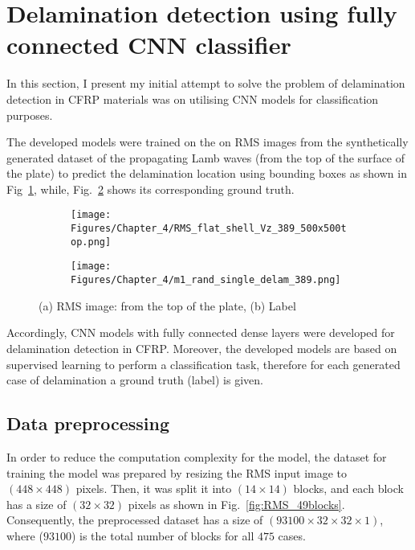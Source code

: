 \section{Delamination detection using fully connected CNN classifier}
\label{sec42}

In this section, I present my initial attempt to solve the problem of delamination detection in CFRP materials was on utilising CNN models for classification purposes.

The developed models were trained on the on RMS images from the synthetically generated dataset of the propagating Lamb waves (from the top of the surface of the plate) to predict the delamination location using bounding boxes as shown in Fig~\ref{fig:RMS_14}, while, Fig.~\ref{fig:label_14} shows its corresponding ground truth.
\begin{figure} [h!]
	\centering
	\begin{subfigure}[b]{0.47\textwidth}
		\centering
		\texttt{[image: Figures/Chapter\_4/RMS\_flat\_shell\_Vz\_389\_500x500top.png]}
		\caption{}
		\label{fig:RMS_14}
	\end{subfigure}
	\hfill
	\begin{subfigure}[b]{0.47\textwidth}
		\centering
		\texttt{[image: Figures/Chapter\_4/m1\_rand\_single\_delam\_389.png]}
		\caption{}
		\label{fig:label_14}
	\end{subfigure}
	\caption{(a) RMS image: from the top of the plate, (b) Label}
	\label{fig:RMS_GT}
\end{figure} 

Accordingly, CNN models with fully connected dense layers were developed for delamination detection in CFRP.
Moreover, the developed models are based on supervised learning to perform a classification task, therefore for each generated case of delamination a ground truth (label) is given.
 
\subsection{Data preprocessing}
\label{sec421}
In order to reduce the computation complexity for the model, the dataset for training the model was prepared by resizing the RMS input image to \((448\times 448)\) pixels.  
Then, it was split it into \((14\times 14)\) blocks, and each block has a size of \((32\times 32)\) pixels as shown in Fig.~\ref{fig:RMS_49blocks}.
Consequently, the preprocessed dataset has a size of \((93100\times 32\times 32 \times 1)\), where (\(93100\)) is the total number of blocks for all \(475\) cases.

